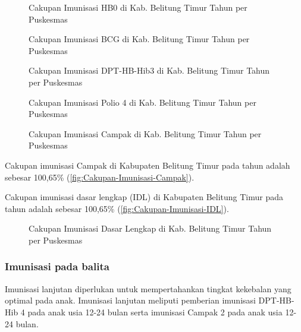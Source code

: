 \begin{figure}[H]
    \centering
    \caption{Cakupan Imunisasi HB0 di Kab. Belitung Timur Tahun \tP per Puskesmas}
    \label{fig:Cakupan-Imunisasi-HB0}
\end{figure}

\begin{figure}[H]
    \centering
    \caption{Cakupan Imunisasi BCG di Kab. Belitung Timur Tahun \tP per Puskesmas}
    \label{fig:Cakupan-Imunisasi-BCG}
\end{figure}

\begin{figure}[H]
    \centering
    \caption{Cakupan Imunisasi DPT-HB-Hib3 di Kab. Belitung Timur Tahun \tP per Puskesmas}
    \label{fig:Cakupan-Imunisasi-DPT}
\end{figure}

\begin{figure}[H]
    \centering
    \caption{Cakupan Imunisasi Polio 4 di Kab. Belitung Timur Tahun \tP per Puskesmas}
    \label{fig:Cakupan-Imunisasi-Polio4}
\end{figure}

\begin{figure}[H]
    \centering
    \caption{Cakupan Imunisasi Campak di Kab. Belitung Timur Tahun \tP per Puskesmas}
    \label{fig:Cakupan-Imunisasi-Campak}
\end{figure}

Cakupan imunisasi Campak di Kabupaten Belitung Timur pada tahun \tP adalah sebesar 100,65\% (\autoref{fig:Cakupan-Imunisasi-Campak}).

Cakupan imunisasi dasar lengkap (IDL) di Kabupaten Belitung Timur pada tahun \tP adalah sebesar 100,65\% (\autoref{fig:Cakupan-Imunisasi-IDL}).

\begin{figure}[H]
    \centering
    \caption{Cakupan Imunisasi Dasar Lengkap di Kab. Belitung Timur Tahun \tP per Puskesmas}
    \label{fig:Cakupan-Imunisasi-IDL}
\end{figure}

\subsubsection{Imunisasi pada balita}
Imunisasi lanjutan diperlukan untuk mempertahankan tingkat kekebalan yang optimal pada anak.
Imunisasi lanjutan meliputi pemberian imunisasi DPT-HB-Hib 4 pada anak usia 12-24 bulan serta imunisasi Campak 2 pada anak usia 12-24 bulan.


